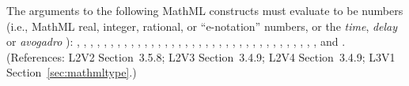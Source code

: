 The arguments to the following MathML constructs must evaluate to be
numbers (i.e., MathML real, integer, rational, or ``e-notation'' numbers,
or the \emph{time}, \emph{delay} or \emph{avogadro} ):
, , , ,
, , , ,
, , , ,
, , , , ,
, , , , ,
, , , , ,
, , , , ,
, , , , and .
(References: L2V2 Section~3.5.8; L2V3 Section~3.4.9; L2V4 Section~3.4.9;
L3V1 Section~\ref{sec:mathmltype}.)
